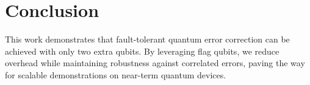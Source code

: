 \documentclass[12pt,a4paper]{article}
\begin{document}
	\section{Conclusion}
	This work demonstrates that fault-tolerant quantum error correction can be achieved with only two extra qubits. By leveraging flag qubits, we reduce overhead while maintaining robustness against correlated errors, paving the way for scalable demonstrations on near-term quantum devices.
	
\end{document}
